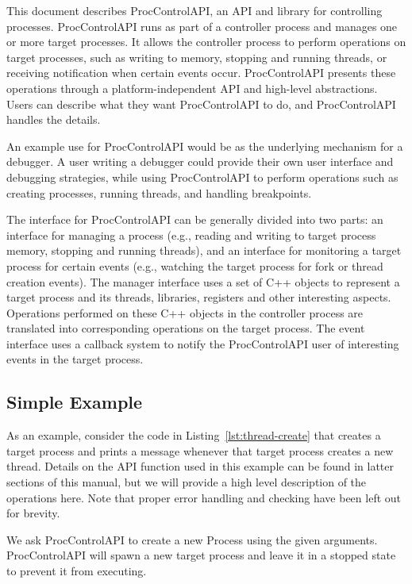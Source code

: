 This document describes ProcControlAPI, an API and library for controlling
processes. ProcControlAPI runs as part of a controller process
and manages one or more target processes. It allows the controller process
to perform operations on target
processes, such as writing to memory, stopping and running threads, or
receiving notification when certain events occur. ProcControlAPI presents
these operations through a platform-independent API and high-level
abstractions. Users can describe what they want ProcControlAPI to do, and
ProcControlAPI handles the details.

An example use for ProcControlAPI would be as the underlying mechanism for a
debugger. A user writing a debugger could provide their own user interface and
debugging strategies, while using ProcControlAPI to perform operations such as
creating processes, running threads, and handling breakpoints.

The interface for ProcControlAPI can be generally divided into two parts: an
interface for managing a process (e.g., reading and writing to target process
memory, stopping and running threads), and an interface for monitoring a target
process for certain events (e.g., watching the target process for fork or
thread creation events). The manager interface uses a set of C++ objects to
represent a target process and its threads, libraries, registers and other
interesting aspects. Operations performed on these C++ objects in the
controller process are translated into corresponding operations on the target
process. The event interface uses a callback system to notify the
ProcControlAPI user of interesting events in the target process.

\subsection{Simple Example}

As an example, consider the code in Listing~\ref{lst:thread-create} that creates a target process and
prints a message whenever that target process creates a new thread. Details
on the API function used in this example can be found in latter sections of
this manual, but we will provide a high level description of the operations
here. Note that proper error handling and checking have been left out for
brevity.



We ask ProcControlAPI to create a new Process using the
given arguments. ProcControlAPI will spawn a new target process
 and leave it in a stopped state to prevent it from executing.

